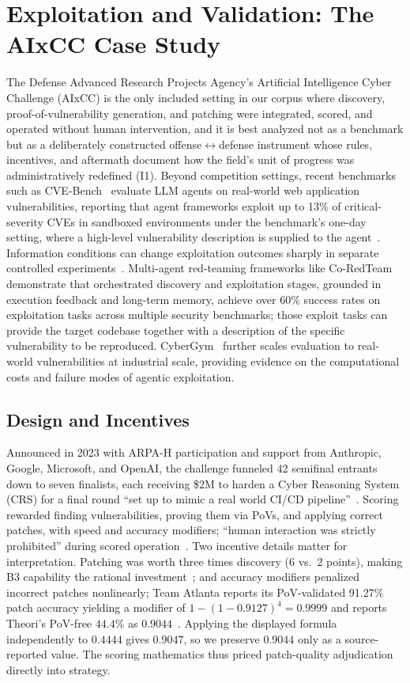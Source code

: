 \documentclass[conference,compsoc]{IEEEtran}
\begin{document}
\section{Exploitation and Validation: The AIxCC Case Study}
\label{sec:aixcc}
The Defense Advanced Research Projects Agency's Artificial Intelligence Cyber Challenge
(AIxCC) is the only included setting in our corpus where discovery, proof-of-vulnerability
generation, and patching were integrated, scored, and operated without human intervention, and it is best
analyzed not as a benchmark but as a deliberately constructed offense$\leftrightarrow$defense
instrument whose rules, incentives, and aftermath document how the field's unit of progress was
administratively redefined (I1). Beyond competition settings, recent benchmarks such as
CVE-Bench~\cite{cvebench2025} evaluate LLM agents on real-world web application vulnerabilities,
reporting that agent frameworks exploit up to 13\% of critical-severity CVEs in
sandboxed environments under the benchmark's one-day setting, where a high-level vulnerability
description is supplied to the agent~\cite{cvebench2025}. Information conditions can change exploitation outcomes sharply in separate controlled experiments~\cite{fang2024agents}. Multi-agent red-teaming frameworks like Co-RedTeam~\cite{coredteam2026}
demonstrate that orchestrated discovery and exploitation stages, grounded in execution feedback
and long-term memory, achieve over 60\% success rates on exploitation tasks across multiple
security benchmarks; those exploit tasks can provide the target codebase together with a description
of the specific vulnerability to be reproduced. CyberGym~\cite{cybergym2026} further scales evaluation to real-world
vulnerabilities at industrial scale, providing evidence on the computational costs and failure
modes of agentic exploitation.

\subsection{Design and Incentives}
Announced in 2023 with ARPA-H participation and support from Anthropic, Google, Microsoft, and
OpenAI, the challenge funneled 42 semifinal entrants down to seven finalists, each
receiving \$2M to harden a Cyber Reasoning System (CRS) for a final round ``set up to mimic a
real world CI/CD pipeline''~\cite{openssfaixcc2026}. Scoring rewarded finding vulnerabilities,
proving them via PoVs, and applying correct patches, with speed and accuracy modifiers;
``human interaction was strictly prohibited'' during scored operation~\cite{tobbuttercup2025}.
Two incentive details matter for interpretation. Patching was worth three times discovery
(6 vs.\ 2 points), making B3 capability the rational investment~\cite{taasc2024}; and accuracy
modifiers penalized incorrect patches nonlinearly; Team Atlanta reports its PoV-validated
91.27\% patch accuracy yielding a modifier of $1-(1-0.9127)^4=0.9999$ and reports Theori's
PoV-free $44.4\%$ as $0.9044$~\cite{taafc2025}. Applying the displayed formula independently
to $0.4444$ gives $0.9047$, so we preserve $0.9044$ only as a source-reported value. The
scoring mathematics thus priced
patch-quality adjudication directly into strategy.
\end{document}
